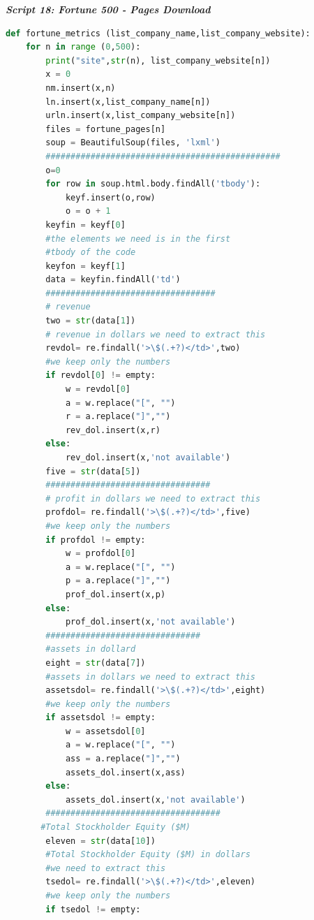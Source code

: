 \documentclass{book}
\begin{document}
\begin{center}
\textit{\textbf{Script 18: Fortune 500 - Pages Download}}\label{p21}
\end{center}
\begin{lstlisting}[language=Python]  
def fortune_metrics (list_company_name,list_company_website):
    for n in range (0,500):          
        print("site",str(n), list_company_website[n])
        x = 0        
        nm.insert(x,n)
        ln.insert(x,list_company_name[n])
        urln.insert(x,list_company_website[n])
        files = fortune_pages[n]
        soup = BeautifulSoup(files, 'lxml')     
        ###############################################
        o=0
        for row in soup.html.body.findAll('tbody'):
            keyf.insert(o,row)
            o = o + 1
        keyfin = keyf[0]  
        #the elements we need is in the first 
        #tbody of the code  
        keyfon = keyf[1]
        data = keyfin.findAll('td')
        ##################################
        # revenue
        two = str(data[1]) 
        # revenue in dollars we need to extract this
        revdol= re.findall('>\$(.+?)</td>',two) 
        #we keep only the numbers
        if revdol[0] != empty:
            w = revdol[0]
            a = w.replace("[", "")
            r = a.replace("]","")
            rev_dol.insert(x,r)
        else:
            rev_dol.insert(x,'not available')
        five = str(data[5])
        #################################
        # profit in dollars we need to extract this   
        profdol= re.findall('>\$(.+?)</td>',five) 
        #we keep only the numbers
        if profdol != empty:
            w = profdol[0]
            a = w.replace("[", "")
            p = a.replace("]","")
            prof_dol.insert(x,p)
        else:
            prof_dol.insert(x,'not available')
        ###############################
        #assets in dollard
        eight = str(data[7]) 
        #assets in dollars we need to extract this
        assetsdol= re.findall('>\$(.+?)</td>',eight) 
        #we keep only the numbers
        if assetsdol != empty:
            w = assetsdol[0]
            a = w.replace("[", "")
            ass = a.replace("]","")
            assets_dol.insert(x,ass)
        else:
            assets_dol.insert(x,'not available')
        ###################################
       #Total Stockholder Equity ($M)    
        eleven = str(data[10]) 
        #Total Stockholder Equity ($M) in dollars 
        #we need to extract this
        tsedol= re.findall('>\$(.+?)</td>',eleven) 
        #we keep only the numbers
        if tsedol != empty:

\end{lstlisting}
\end{document}
